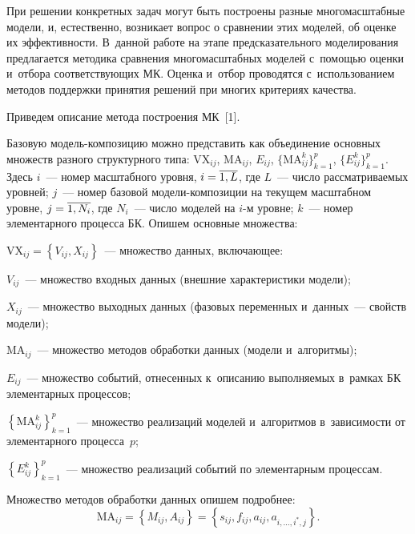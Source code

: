 \begin{multicols}{2}
   При решении конкретных задач могут быть построены разные 
многомасштабные модели, и, естественно, возникает вопрос о сравнении этих 
моделей, об оценке их эффективности. В~данной работе на этапе 
предсказательного моделирования предлагается методика сравнения 
многомасштабных моделей с~помощью оценки и~отбора соответствующих 
МК. Оценка и~отбор проводятся с~использованием 
методов поддержки принятия решений при многих критериях качества.
   
   Приведем описание метода построения МК~[1].
   
   Базовую модель-ком\-по\-зи\-цию можно представить как объединение 
основных множеств разного структурного типа:
   $\mathrm{VX}_{ij}$, $\mathrm{MA}_{ij}$, $E_{ij}$, 
   $\{\mathrm{MA}^k_{ij}\}^p_{k=1}$, $\{E^k_{ij}\}^p_{k=1}.$
   Здесь $i$~--- номер масштабного уровня, $i\hm=\overline{1,L}$, где $L$~--- 
число рассматриваемых уровней; $j$~--- номер базовой модели-композиции на 
текущем масштабном уровне, $j\hm=\overline{1,N_i}$, где
$N_i$~--- число моделей 
на $i$-м уровне; $k$~--- номер элементарного процесса БК. Опишем основные 
множества:
   \begin{description}
   \item
   $\mathrm{VX}_{ij}=\left\{ V_{ij}, X_{ij}\right\}$~--- множество данных, включающее:
   \begin{description}
   \item
   $V_{ij}$~--- множество входных данных (внешние характеристики модели);
   \item
      $X_{ij}$~--- множество выходных данных (фазовых переменных 
и~данных~--- свойств модели);
      \end{description}
   \item
         $\mathrm{MA}_{ij}$~--- множество методов обработки данных (модели и~алгоритмы);
   \item
   $E_{ij}$~--- множество событий, отнесенных к~описанию выполняемых 
в~рамках БК элементарных процессов;
   \item
   $\left\{\mathrm{MA}_{ij}^k\right\}^p_{k=1}$~--- множество реализаций моделей 
и~алгоритмов в~зависимости от элементарного процесса~$p$;
   \item
   $\left\{ E^k_{ij}\right\}^p_{k=1}$~--- множество реализаций событий по 
элементарным процессам.
   \end{description}
   
   Множество методов обработки данных опишем подробнее:
   $$
   \mathrm{MA}_{ij}=\left\{ M_{ij}, A_{ij}\right\} = 
   \left\{ s_{ij}, f_{ij}, a_{ij}, a_{i,\ldots 
,i^*,j}\right\}.
   $$ 
   

\end{multicols}
